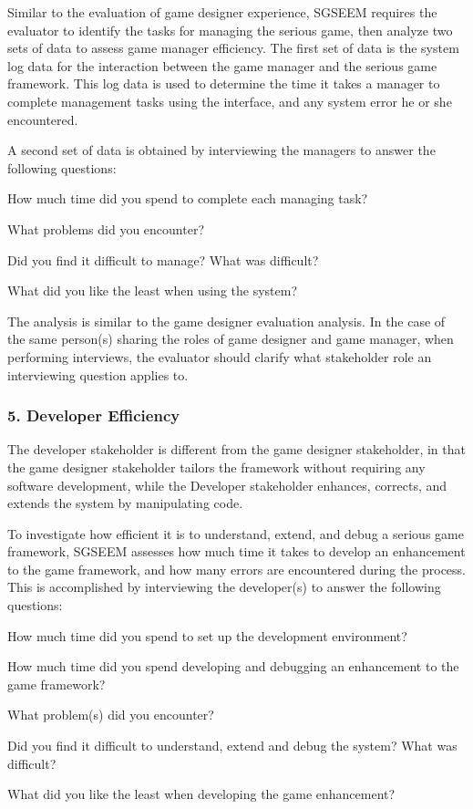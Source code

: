 \documentclass{sigchi}
\begin{document}
Similar to the evaluation of game designer experience, SGSEEM requires the evaluator to
identify the tasks for managing the serious game, then
analyze two sets of data to assess game manager efficiency. The
first set of data is the system log data for the interaction between
the game manager and the serious game framework. This log data is used to
determine the time it takes a manager to complete
management tasks using the interface, and any system error he or she
encountered. 

A second set of data is obtained by interviewing the managers to answer the following
questions:

\begin{compactitem}
\item How much time did you spend to complete each managing task?
\item What problems did you encounter?
\item Did you find it difficult to manage? What was difficult?
\item What did you like the least when using the system?
\end{compactitem}

The analysis is similar to the game designer evaluation analysis. In the case of the same
person(s) sharing the roles of game designer and game manager, when performing interviews, the
evaluator should clarify what stakeholder role an interviewing question applies to.

\subsubsection{5. Developer Efficiency}

The developer stakeholder is different from the game designer stakeholder, in that the
game designer stakeholder tailors the framework without requiring any software
development, while the Developer stakeholder enhances, corrects, and extends the system by
manipulating code. 

To investigate how efficient it is to understand, extend, and debug a serious game
framework, SGSEEM assesses how much time it takes to develop an
enhancement to the game framework, and how many errors are encountered
during the process. This is accomplished by interviewing the developer(s) to
answer the following questions:

\begin{compactitem}
\item How much time did you spend to set up the development
  environment?
\item How much time did you spend developing and debugging an
  enhancement to the game framework?
\item What problem(s) did you encounter?
\item Did you find it difficult to understand, extend and debug the
  system? What was difficult?
\item What did you like the least when developing the game
  enhancement? 
\end{compactitem}
\end{document}
